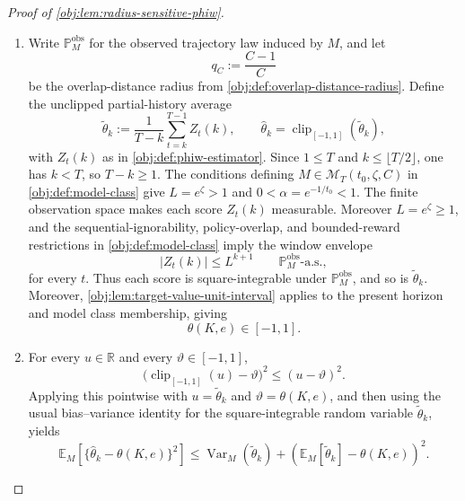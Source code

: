 \documentclass[11pt]{article}
\begin{document}
\begin{proof}[Proof of \cref{obj:lem:radius-sensitive-phiw}]
\begin{enumerate}
\item
Write \(\mathbb P_M^{\mathrm{obs}}\) for the observed trajectory law induced by \(M\), and let
\[
q_C:=\frac{C-1}{C}
\]
be the overlap-distance radius from \cref{obj:def:overlap-distance-radius}.  Define the unclipped partial-history average
\[
\widetilde\theta_k
:=
\frac{1}{T-k}\sum_{t=k}^{T-1} Z_t(k),
\qquad
\widehat\theta_k
=
\operatorname{clip}_{[-1,1]}(\widetilde\theta_k),
\]
with \(Z_t(k)\) as in \cref{obj:def:phiw-estimator}.  Since \(1\le T\) and \(k\le \lfloor T/2\rfloor\), one has \(k<T\), so \(T-k\ge 1\).  The conditions defining \(M\in\mathcal M_T(t_0,\zeta,C)\) in \cref{obj:def:model-class} give \(L=e^\zeta>1\) and \(0<\alpha=e^{-1/t_0}<1\).  The finite observation space makes each score \(Z_t(k)\) measurable.  Moreover \(L=e^\zeta\ge 1\), and the sequential-ignorability, policy-overlap, and bounded-reward restrictions in \cref{obj:def:model-class} imply the window envelope
\[
|Z_t(k)|\le L^{k+1}
\qquad \mathbb P_M^{\mathrm{obs}}\text{-a.s.},
\]
for every \(t\).  Thus each score is square-integrable under \(\mathbb P_M^{\mathrm{obs}}\), and so is \(\widetilde\theta_k\).  Moreover, \cref{obj:lem:target-value-unit-interval} applies to the present horizon and model class membership, giving
\[
\theta(K,e)\in[-1,1].
\] %

\item
For every \(u\in\mathbb R\) and every \(\vartheta\in[-1,1]\),
\[
\bigl(\operatorname{clip}_{[-1,1]}(u)-\vartheta\bigr)^2
\le
(u-\vartheta)^2.
\]
Applying this pointwise with \(u=\widetilde\theta_k\) and \(\vartheta=\theta(K,e)\), and then using the usual bias--variance identity for the square-integrable random variable \(\widetilde\theta_k\), yields
\[
\mathbb E_M\!\left[
\{\widehat\theta_k-\theta(K,e)\}^2
\right]
\le
\operatorname{Var}_M(\widetilde\theta_k)
+
\left(
\mathbb E_M[\widetilde\theta_k]-\theta(K,e)
\right)^2 .
\] %


\end{enumerate}
\end{proof}
\end{document}
